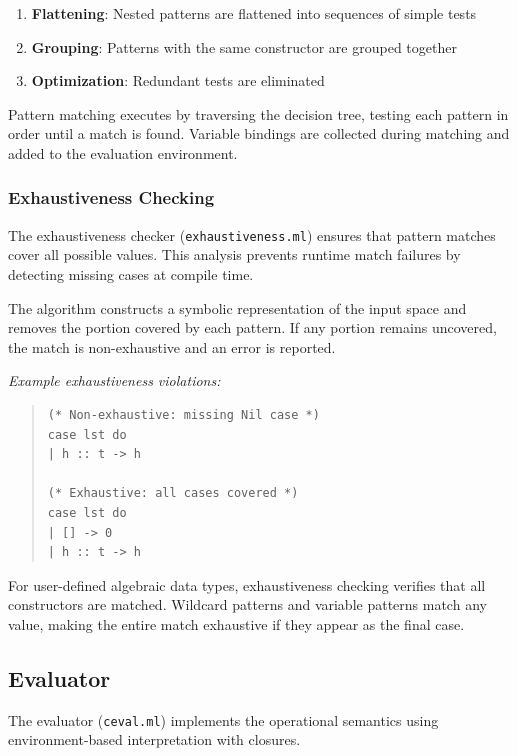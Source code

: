 \documentclass[conference,onecolumn]{IEEEtran}
\begin{document}
\begin{enumerate}
\item \textbf{Flattening}: Nested patterns are flattened into sequences of simple tests
\item \textbf{Grouping}: Patterns with the same constructor are grouped together
\item \textbf{Optimization}: Redundant tests are eliminated
\end{enumerate}

Pattern matching executes by traversing the decision tree, testing each pattern in order until a match is found. Variable bindings are collected during matching and added to the evaluation environment.

\subsubsection{Exhaustiveness Checking}

The exhaustiveness checker (\texttt{exhaustiveness.ml}) ensures that pattern matches cover all possible values. This analysis prevents runtime match failures by detecting missing cases at compile time.

The algorithm constructs a symbolic representation of the input space and removes the portion covered by each pattern. If any portion remains uncovered, the match is non-exhaustive and an error is reported.

\textit{Example exhaustiveness violations:}

\begin{quote}
\small
\begin{verbatim}
(* Non-exhaustive: missing Nil case *)
case lst do
| h :: t -> h

(* Exhaustive: all cases covered *)
case lst do
| [] -> 0
| h :: t -> h
\end{verbatim}
\end{quote}

For user-defined algebraic data types, exhaustiveness checking verifies that all constructors are matched. Wildcard patterns and variable patterns match any value, making the entire match exhaustive if they appear as the final case.

\subsection{Evaluator}

The evaluator (\texttt{ceval.ml}) implements the operational semantics using environment-based interpretation with closures.
\end{document}
